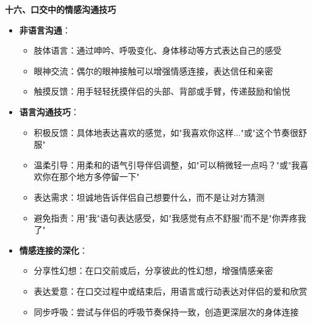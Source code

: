 \documentclass[12pt,UTF8]{ctexbook}
\begin{document}
  \textbf{十六、口交中的情感沟通技巧}
  \begin{itemize}
  \item \textbf{非语言沟通}：
    \begin{itemize}
    \item 肢体语言：通过呻吟、呼吸变化、身体移动等方式表达自己的感受
    \item 眼神交流：偶尔的眼神接触可以增强情感连接，表达信任和亲密
    \item 触摸反馈：用手轻轻抚摸伴侣的头部、背部或手臂，传递鼓励和愉悦
    \end{itemize}
  \item \textbf{语言沟通技巧}：
    \begin{itemize}
    \item 积极反馈：具体地表达喜欢的感觉，如"我喜欢你这样..."或"这个节奏很舒服"
    \item 温柔引导：用柔和的语气引导伴侣调整，如"可以稍微轻一点吗？"或"我喜欢你在那个地方多停留一下"
    \item 表达需求：坦诚地告诉伴侣自己想要什么，而不是让对方猜测
    \item 避免指责：用"我"语句表达感受，如"我感觉有点不舒服"而不是"你弄疼我了"
    \end{itemize}
  \item \textbf{情感连接的深化}：
    \begin{itemize}
    \item 分享性幻想：在口交前或后，分享彼此的性幻想，增强情感亲密
    \item 表达爱意：在口交过程中或结束后，用语言或行动表达对伴侣的爱和欣赏
    \item 同步呼吸：尝试与伴侣的呼吸节奏保持一致，创造更深层次的身体连接
    \end{itemize}
  \end{itemize}
\end{document}
